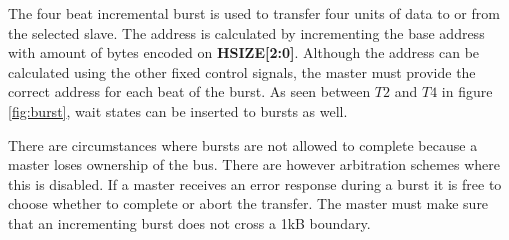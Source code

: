 The four beat incremental burst is used to transfer four units of data to or from the selected slave. The address is calculated by incrementing the base address
with amount of bytes encoded on \textbf{HSIZE[2:0]}. Although the address can be calculated using the other fixed control signals, the master must provide the correct address for each beat of the burst. As seen between $T2$ and $T4$ in figure \ref{fig:burst}, wait states can be inserted to bursts as well. \par
There are circumstances where bursts are not allowed to complete because a master loses ownership of the bus. There are however arbitration schemes where this is disabled. If a master receives an error response during a burst it is free to choose whether to complete or abort the transfer. The master must make sure
that an incrementing burst does not cross a 1kB boundary.  



